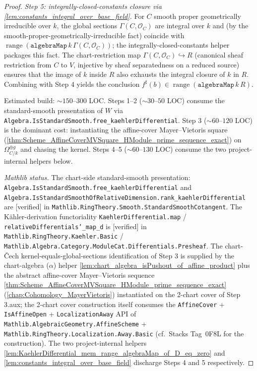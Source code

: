\begin{proof}
  \emph{Step 5: integrally-closed-constants closure via \cref{lem:constants_integral_over_base_field}.} For \(C\) smooth proper geometrically irreducible over \(k\), the global sections \(\Gamma(C, \mathcal O_C)\) are integral over \(k\) and (by the smooth-proper-geometrically-irreducible fact) coincide with \(\operatorname{range}(\mathtt{algebraMap}\,k\,\Gamma(C, \mathcal O_C))\); the integrally-closed-constants helper packages this fact. The chart-restriction map \(\Gamma(C, \mathcal O_C) \hookrightarrow R\) (canonical sheaf restriction from \(C\) to \(V\), injective by sheaf separatedness on a reduced source) ensures that the image of \(k\) inside \(R\) also exhausts the integral closure of \(k\) in \(R\). Combining with Step 4 yields the conclusion \(f^{\sharp}(b) \in \operatorname{range}(\mathtt{algebraMap}\,k\,R)\).

  Estimated build: \(\sim 150\)--\(300\) LOC. Steps 1--2 (\(\sim 30\)--\(50\) LOC) consume the standard-smooth presentation of \(W\) via \texttt{Algebra.IsStandardSmooth.free\_kaehlerDifferential}. Step 3 (\(\sim 60\)--\(120\) LOC) is the dominant cost: instantiating the affine-cover Mayer--Vietoris square (\cref{thm:Scheme_AffineCoverMVSquare_HModule_prime_sequence_exact}) on \(\Omega_{C/k}^{\oplus g}\) and chasing the kernel. Steps 4--5 (\(\sim 60\)--\(130\) LOC) consume the two project-internal helpers below.

  \emph{Mathlib status.} The chart-side standard-smooth presentation: \texttt{Algebra.IsStandardSmooth.free\_kaehlerDifferential} and \texttt{Algebra.IsStandardSmoothOfRelativeDimension.rank\_kaehlerDifferential} are [verified] in \texttt{Mathlib.RingTheory.Smooth.StandardSmoothCotangent}. The K\"ahler-derivation functoriality \texttt{KaehlerDifferential.map} / \texttt{relativeDifferentials'\_map\_d} is [verified] in \texttt{Mathlib.RingTheory.Kaehler.Basic} / \texttt{Mathlib.Algebra.Category.ModuleCat.Differentials.Presheaf}. The chart-\v Cech kernel-equals-global-sections identification of Step 3 is supplied by the chart-algebra (\(\alpha\)) helper \cref{lem:chart_algebra_isPushout_of_affine_product} plus the abstract affine-cover Mayer--Vietoris sequence \cref{thm:Scheme_AffineCoverMVSquare_HModule_prime_sequence_exact} (\cref{chap:Cohomology_MayerVietoris}) instantiated on the 2-chart cover of Step 3.aux; the 2-chart cover construction itself consumes the \texttt{AffineCover} + \texttt{IsAffineOpen} + \texttt{LocalizationAway} API of \texttt{Mathlib.AlgebraicGeometry.AffineScheme} + \texttt{Mathlib.RingTheory.Localization.Away.Basic} (cf.\ Stacks Tag~0F8L for the construction). The two project-internal helpers \cref{lem:KaehlerDifferential_mem_range_algebraMap_of_D_eq_zero} and \cref{lem:constants_integral_over_base_field} discharge Steps 4 and 5 respectively.
\end{proof}

